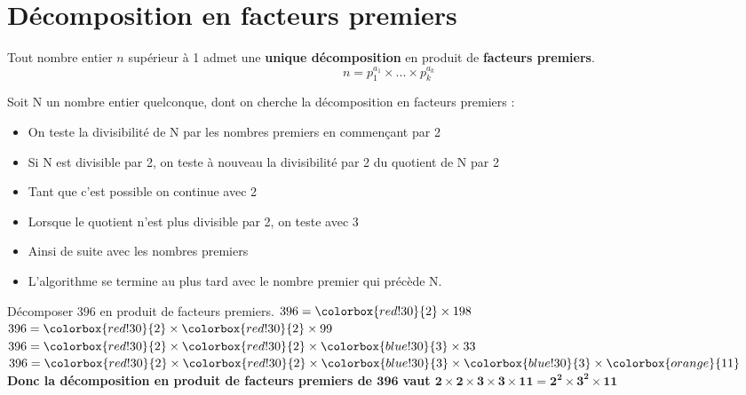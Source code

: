 \section{Décomposition en facteurs premiers}

\begin{propriete}[\admise]
Tout nombre entier $n$ supérieur à 1 admet une \textbf{unique décomposition} en produit de \textbf{facteurs premiers}.
$$n=p_1^{a_1}\times...\times p_k^{a_k}$$
\end{propriete}

\begin{methode}
    \label{N2methode4}
    Soit N un nombre entier quelconque, dont on cherche la décomposition en facteurs premiers :
    \begin{itemize}
        \item On teste la divisibilité de N par les nombres premiers en commençant par 2
        \item Si N est divisible par 2, on teste à nouveau la divisibilité par 2 du quotient de N par 2
        \item Tant que c'est possible on continue avec 2
        \item Lorsque le quotient n'est plus divisible par 2, on teste avec 3
        \item Ainsi de suite avec les nombres premiers 
        \item L'algorithme se termine au plus tard avec le nombre premier qui précède N.
    \end{itemize}
    \exercice
    Décomposer $396$ en produit de facteurs premiers.
    \correction
    $396 = \colorbox{red!30}{2} \times  198$\\
    $396 = \colorbox{red!30}{2} \times  \colorbox{red!30}{2} \times  99$\\
    $396 = \colorbox{red!30}{2} \times  \colorbox{red!30}{2} \times  \colorbox{blue!30}{3} \times  33$\\
    $396 = \colorbox{red!30}{2} \times  \colorbox{red!30}{2} \times  \colorbox{blue!30}{3} \times  \colorbox{blue!30}{3} \times  \colorbox{orange}{11}$\\
    {\bfseries Donc la décomposition en produit de facteurs premiers de $\mathbf{396}$ vaut $\mathbf{2 \times  2 \times  3 \times  3 \times  11 = 2^2\times 3^2\times 11}$}

\end{methode}

